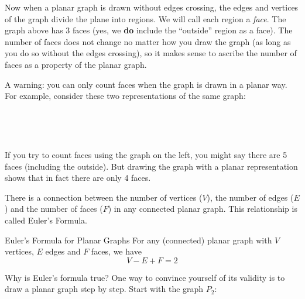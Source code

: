 \documentclass[12pt]{article}
\begin{document}
Now when a planar graph is drawn without edges crossing, the edges and vertices of the graph divide the plane into regions.  We will call each region a {\em face}.  The graph above has 3 faces (yes, we \textbf{do} include the ``outside'' region as a face).  The number of faces does not change no matter how you draw the graph (as long as you do so without the edges crossing), so it makes sense to ascribe the number of faces as a property of the planar graph.

A warning: you can only count faces when the graph is drawn in a planar way.  For example, consider these two representations of the same graph:

\begin{center}
 ~ \hfill
  \hfill
  \hfill ~
\end{center}

If you try to count faces using the graph on the left, you might say there are 5 faces (including the outside).  But drawing the graph with a planar representation shows that in fact there are only 4 faces.



There is a connection between the number of vertices ($V$), the number of edges ($E$) and the number of faces ($F$) in any connected planar graph.  This relationship is called Euler's Formula.

\begin{defbox}{Euler's Formula for Planar Graphs}
For any (connected) planar graph with $V$ vertices, $E$ edges and $F$ faces, we have
\[V-E + F = 2\]
\end{defbox}

Why is Euler's formula true?  One way to convince yourself of its validity is to draw a planar graph step by step.  Start with the graph $P_2$:

\begin{center}
\end{center}
\end{document}
